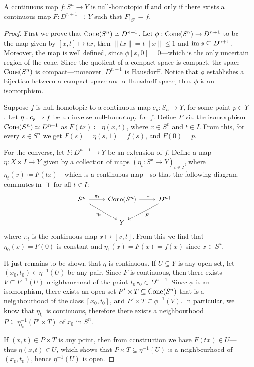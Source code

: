 \begin{proposition}
\label{prop:map-from-Sn-is-null-homotopic}
A continuous map \(f: S^n \to Y\) is null-homotopic if and only if there
exists a continuous map \(F: D^{n+1} \to Y\) such that \(F|_{S^n} = f\).
\end{proposition}

\begin{proof}
First we prove that \(\operatorname{Cone}(S^n) \simeq D^{n+1}\). Let
\(\phi: \operatorname{Cone}(S^n) \to D^{n+1}\) to be the map given by \([x, t] \mapsto t x\),
then \(\| t x \| = t \| x \| \leq 1\) and \(\operatorname{im} \phi \subseteq
D^{n+1}\). Moreover, the map is well defined, since \(\phi[x, 0] = 0\)---which
is the only uncertain region of the cone. Since the quotient of a compact space
is compact, the space \(\operatorname{Cone}(S^n)\) is compact---moreover, \(D^{n+1}\) is
Hausdorff. Notice that \(\phi\) establishes a bijection between a compact space
and a Hausdorff space, thus \(\phi\) is an isomorphism.

Suppose \(f\) is null-homotopic to a continuous map \(c_p: S_n \to Y\), for some
point \(p \in Y\). Let \(\eta: c_p \Rightarrow f\) be an inverse null-homotopy for
\(f\). Define \(F\) via the isomorphism \(\operatorname{Cone}(S^n) \simeq D^{n+1}\) as \(F(t x)
\coloneq \eta(x, t)\), where \(x \in S^n\) and \(t \in I\). From this, for every
\(s \in S^n\) we get \(F(s) = \eta(s, 1) = f(s)\), and \(F(0) = p\).

For the converse, let \(F: D^{n+1} \to Y\) be an extension of \(f\). Define a
map \(\eta: X \times I \to Y\) given by a collection of maps
\((\eta_t: S^n \to Y)_{t \in I}\), where \(\eta_t(x) \coloneq F(t x)\)---which
is a continuous map---so that the following diagram commutes in \(\Top\) for all
\(t \in I\):
\[
\begin{tikzcd}
S^n \ar[r, "\pi_t"] \ar[rd, "\eta_t"']
&\Cone(S^n) \ar[r, "\dis"]
&D^{n+1} \ar[ld, "F"] \\
&Y &
\end{tikzcd}
\]
where \(\pi_t\) is the continuous map \(x \mapsto [x, t]\). From this we find
that \(\eta_0(x) = F(0)\) is constant and \(\eta_1(x) = F(x) = f(x)\) since
\(x \in S^n\).

It just remains to be shown that \(\eta\) is continuous. If \(U \subseteq Y\) is
any open set, let \((x_0, t_0) \in \eta^{-1}(U)\) be any pair. Since \(F\) is
continuous, then there exists \(V \subseteq F^{-1}(U)\) neighbourhood of the
point \(t_0 x_0 \in D^{n+1}\). Since \(\phi\) is an isomorphism, there exists an
open set \(P' \times T \subseteq \operatorname{Cone}(S^n)\) that is a neighbourhood of the
class \([x_0, t_0]\), and \(P' \times T \subseteq \phi^{-1}(V)\). In particular,
we know that \(\eta_{t_0}\) is continuous, therefore there exists a
neighbourhood \(P \subseteq \eta_{t_0}^{-1}(P' \times T)\) of \(x_0\) in
\(S^n\).

If \((x, t) \in P \times T\) is any point, then from construction we have
\(F(t x) \in U\)---thus \(\eta(x, t) \in U\), which shows that
\(P \times T \subseteq \eta^{-1}(U)\) is a neighbourhood of \((x_0, t_0)\),
hence \(\eta^{-1}(U)\) is open.
\end{proof}

